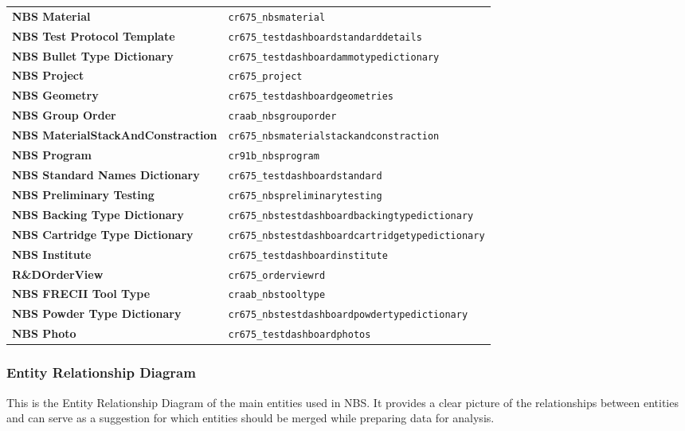 \begin{footnotesize}
\begin{tabularx}{\textwidth}{l|l}
		\textbf{NBS Material} & \texttt{cr675\_nbsmaterial} \\[0.5em]
		\textbf{NBS Test Protocol Template} & \texttt{cr675\_testdashboardstandarddetails} \\[0.5em]
		\textbf{NBS Bullet Type Dictionary} & \texttt{cr675\_testdashboardammotypedictionary} \\[0.5em]
		\textbf{NBS Project} & \texttt{cr675\_project} \\[0.5em]
		\textbf{NBS Geometry} & \texttt{cr675\_testdashboardgeometries} \\[0.5em]
		\textbf{NBS Group Order} & \texttt{craab\_nbsgrouporder} \\[0.5em]
		\textbf{NBS MaterialStackAndConstraction} & \texttt{cr675\_nbsmaterialstackandconstraction} \\[0.5em]
		\textbf{NBS Program} & \texttt{cr91b\_nbsprogram} \\[0.5em]
		\textbf{NBS Standard Names Dictionary} & \texttt{cr675\_testdashboardstandard} \\[0.5em]
		\textbf{NBS Preliminary Testing} & \texttt{cr675\_nbspreliminarytesting} \\[0.5em]
		\textbf{NBS Backing Type Dictionary} & \texttt{cr675\_nbstestdashboardbackingtypedictionary} \\[0.5em]
		\textbf{NBS Cartridge Type Dictionary} & \texttt{cr675\_nbstestdashboardcartridgetypedictionary} \\[0.5em]
		\textbf{NBS Institute} & \texttt{cr675\_testdashboardinstitute} \\[0.5em]
		\textbf{R\&DOrderView} & \texttt{cr675\_orderviewrd} \\[0.5em]
		\textbf{NBS FRECII Tool Type} & \texttt{craab\_nbstooltype} \\[0.5em]
		\textbf{NBS Powder Type Dictionary} & \texttt{cr675\_nbstestdashboardpowdertypedictionary} \\[0.5em]
		\textbf{NBS Photo} & \texttt{cr675\_testdashboardphotos} \\[0.5em]
	\end{tabularx}
\end{footnotesize}

\subsubsection{Entity Relationship Diagram}

This is the Entity Relationship Diagram of the main entities used in NBS. It provides a clear picture of the relationships between entities and can serve as a suggestion for which entities should be merged while preparing data for analysis.

